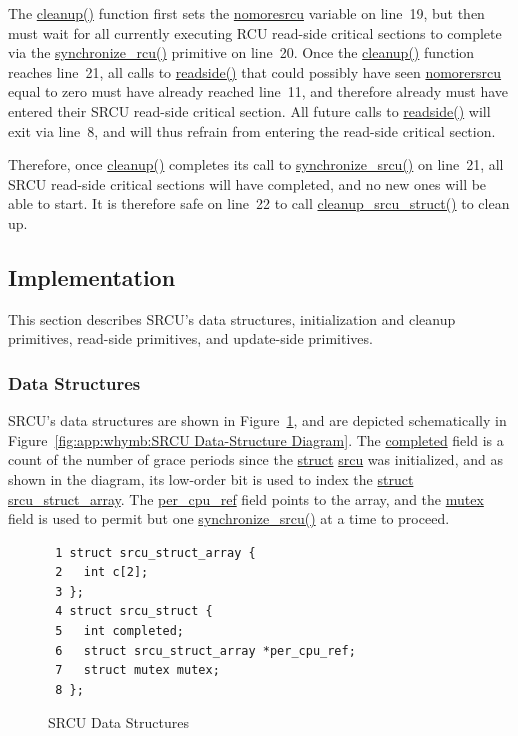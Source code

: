 The \url{cleanup()} function first sets the \url{nomoresrcu} variable
on line~19, but then must wait for all currently executing RCU read-side
critical sections to complete via the \url{synchronize_rcu()} primitive
on line~20.
Once the \url{cleanup()} function reaches line~21, all calls to
\url{readside()} that could possibly have seen \url{nomorersrcu} equal
to zero must have already reached line~11, and therefore already must
have entered their SRCU read-side critical section.
All future calls to \url{readside()} will exit via line~8, and will thus
refrain from entering the read-side critical section.

Therefore, once \url{cleanup()} completes its call to
\url{synchronize_srcu()} on line~21, all SRCU read-side critical sections
will have completed, and no new ones will be able to start.
It is therefore safe on line~22 to call \url{cleanup_srcu_struct()}
to clean up.

\subsection{Implementation}
\label{sec:app:rcuimpl:Implementation}

This section describes SRCU's data structures, initialization and
cleanup primitives, read-side primitives, and update-side primitives.

\subsubsection{Data Structures}
\label{sec:app:rcuimpl:Data Structures}

SRCU's data structures are shown in
Figure~\ref{fig:app:rcuimpl:SRCU Data Structures},
and are depicted schematically in
Figure~\ref{fig:app:whymb:SRCU Data-Structure Diagram}.
The \url{completed} field is a count of the number of grace periods
since the \url{struct} \url{srcu} was initialized, and as shown in the
diagram, its low-order bit is used to index the
\url{struct} \url{srcu_struct_array}.
The \url{per_cpu_ref} field points to the array, and the
\url{mutex} field is used to permit but one \url{synchronize_srcu()} at
a time to proceed.

\begin{figure}[htbp]
{ \scriptsize
\begin{verbatim}
 1 struct srcu_struct_array {
 2   int c[2];
 3 };
 4 struct srcu_struct {
 5   int completed;
 6   struct srcu_struct_array *per_cpu_ref;
 7   struct mutex mutex;
 8 };
\end{verbatim}
}
\caption{SRCU Data Structures}
\label{fig:app:rcuimpl:SRCU Data Structures}
\end{figure}

